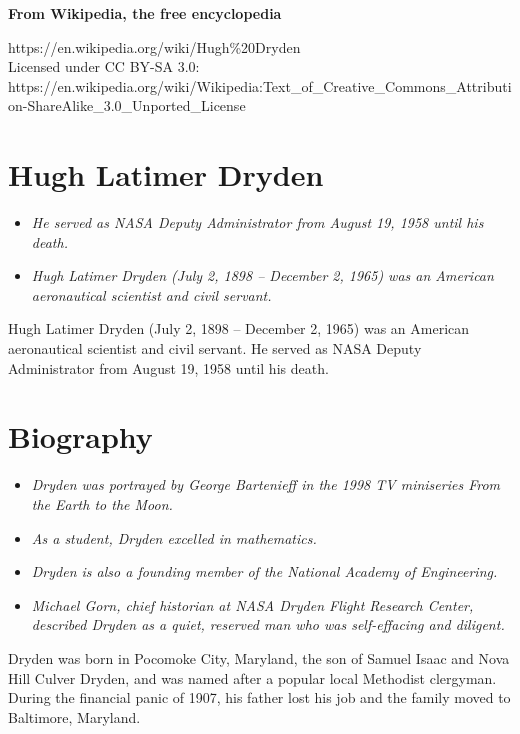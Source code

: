\textbf{From Wikipedia, the free encyclopedia}

https://en.wikipedia.org/wiki/Hugh\%20Dryden\\
Licensed under CC BY-SA 3.0:\\
https://en.wikipedia.org/wiki/Wikipedia:Text\_of\_Creative\_Commons\_Attribution-ShareAlike\_3.0\_Unported\_License

\section{Hugh Latimer Dryden}\label{hugh-latimer-dryden}

\begin{itemize}
\item
  \emph{He served as NASA Deputy Administrator from August 19, 1958
  until his death.}
\item
  \emph{Hugh Latimer Dryden (July 2, 1898 -- December 2, 1965) was an
  American aeronautical scientist and civil servant.}
\end{itemize}

Hugh Latimer Dryden (July 2, 1898 -- December 2, 1965) was an American
aeronautical scientist and civil servant. He served as NASA Deputy
Administrator from August 19, 1958 until his death.

\section{Biography}\label{biography}

\begin{itemize}
\item
  \emph{Dryden was portrayed by George Bartenieff in the 1998 TV
  miniseries From the Earth to the Moon.}
\item
  \emph{As a student, Dryden excelled in mathematics.}
\item
  \emph{Dryden is also a founding member of the National Academy of
  Engineering.}
\item
  \emph{Michael Gorn, chief historian at NASA Dryden Flight Research
  Center, described Dryden as a quiet, reserved man who was
  self-effacing and diligent.}
\end{itemize}

Dryden was born in Pocomoke City, Maryland, the son of Samuel Isaac and
Nova Hill Culver Dryden, and was named after a popular local Methodist
clergyman. During the financial panic of 1907, his father lost his job
and the family moved to Baltimore, Maryland.

